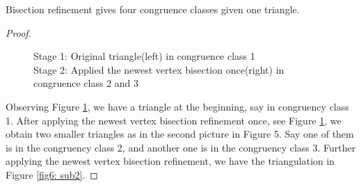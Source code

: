     \begin{lemma}
    Bisection refinement gives four congruence classes given one triangle.
    \label{lma6}
    \end{lemma}
    \begin{proof}
    \begin{figure}[h!]
    \centering
    \captionsetup{justification=centering}
    \caption{Stage 1: Original triangle(left) in congruence class 1\\Stage 2: Applied the newest vertex bisection once(right) in congruence class 2 and 3}
    \label{fig6: sub1}
    \end{figure}

    Observing Figure \ref{fig6: sub1}, we have a triangle at the beginning, say in congruency class 1. After applying the newest vertex bisection refinement once, see Figure \ref{fig6: sub1}, we obtain two smaller triangles as in the second picture in Figure 5. Say one of them is in the congruency class 2, and another one is in the congruency class 3. Further applying the newest vertex bisection refinement, we have the triangulation in Figure \ref{fig6: sub2}.


\end{proof}
